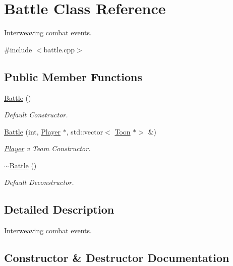 \hypertarget{classBattle}{}\section{Battle Class Reference}
\label{classBattle}


Interweaving combat events.  




{\ttfamily \#include $<$battle.\+cpp$>$}

\subsection*{Public Member Functions}
\begin{DoxyCompactItemize}
\item 
\mbox{\label{classBattle_abecc253b23b71da260445e4bdc8522e2}} 
\mbox{\hyperlink{classBattle_abecc253b23b71da260445e4bdc8522e2}{Battle}} ()
\begin{DoxyCompactList}\small\item\em Default Constructor. \end{DoxyCompactList}\item 
\mbox{\hyperlink{classBattle_a50345276f46e21c407dc6421662e5c2d}{Battle}} (int, \mbox{\hyperlink{classPlayer}{Player}} $\ast$, std\+::vector$<$ \mbox{\hyperlink{classToon}{Toon}} $\ast$$>$ \&)
\begin{DoxyCompactList}\small\item\em \mbox{\hyperlink{classPlayer}{Player}} v Team Constructor. \end{DoxyCompactList}\item 
\mbox{\label{classBattle_ae44141e587836ba84243cad46b17c228}} 
\mbox{\hyperlink{classBattle_ae44141e587836ba84243cad46b17c228}{$\sim$\+Battle}} ()
\begin{DoxyCompactList}\small\item\em Default Deconstructor. \end{DoxyCompactList}\end{DoxyCompactItemize}


\subsection{Detailed Description}
Interweaving combat events. 

\subsection{Constructor \& Destructor Documentation}
\mbox{\label{classBattle_a50345276f46e21c407dc6421662e5c2d}} 
